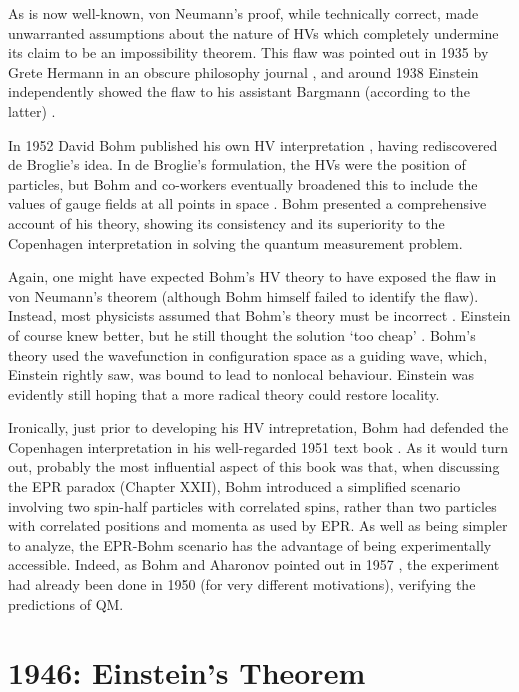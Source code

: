 \documentclass[12pt]{iopart}
\begin{document}
As is now well-known, von Neumann's proof, while technically correct, 
made unwarranted assumptions about the nature of HVs which completely undermine
its claim to be an impossibility theorem.  This flaw  was 
pointed out in 1935 by Grete Hermann in an obscure philosophy journal \cite{Wic95}, 
and around 1938 Einstein independently showed the flaw to his
assistant Bargmann (according to the latter)  \cite{Wic95}. 

In 1952 David Bohm published his own HV interpretation \cite{Boh52}, having
rediscovered de Broglie's idea. In de Broglie's formulation, the HVs were the position of particles, but Bohm and co-workers eventually broadened this to include the values of gauge fields at all points in space \cite{BohHil93}. 
Bohm presented a comprehensive account of his theory, showing its consistency and  its 
superiority to the Copenhagen interpretation in solving the quantum measurement problem.

Again, one might have expected Bohm's HV theory to have exposed the flaw in 
von Neumann's theorem (although Bohm himself failed to identify the flaw). Instead, most
physicists assumed that Bohm's theory must be incorrect \cite{Whi96}. Einstein of course knew better, 
but he still thought the solution `too cheap'   \cite{Whi96}. Bohm's theory 
used the wavefunction in configuration space as a guiding wave, which, 
Einstein rightly saw, was bound to lead to nonlocal behaviour.
Einstein was evidently still hoping that a more radical theory could restore locality.

Ironically, just prior to developing his HV intrepretation, Bohm had defended the Copenhagen interpretation in his well-regarded 1951 text book \cite{Boh51}. As it would turn out, 
probably the most influential aspect of this book was that, when discussing the EPR paradox (Chapter XXII), Bohm introduced a simplified   scenario involving two spin-half particles with correlated spins, rather than two particles with correlated positions and momenta as used by EPR. As well as being simpler to analyze, the EPR-Bohm scenario has the advantage of being experimentally accessible. Indeed, as Bohm and Aharonov pointed out in 1957 \cite{BohAha57}, the experiment had already been done in 1950  (for very different motivations), verifying the predictions of QM. 

\section{1946: Einstein's Theorem} \label{sec:ET}
\end{document}
